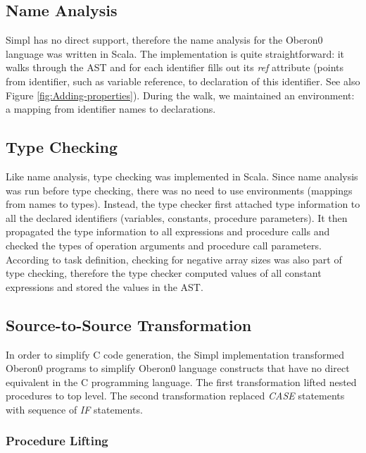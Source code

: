 \subsection{Name Analysis}

Simpl has no direct support, therefore the name analysis for the Oberon0
language was written in Scala. The implementation is quite straightforward:
it walks through the AST and for each identifier fills out its \emph{ref}
attribute (points from identifier, such as variable reference, to
declaration of this identifier. See also Figure \ref{fig:Adding-properties}).
During the walk, we maintained an environment: a mapping from identifier
names to declarations.






\subsection{Type Checking}

Like name analysis, type checking was implemented in Scala. Since
name analysis was run before type checking, there was no need to use
environments (mappings from names to types). Instead, the type checker
first attached type information to all the declared identifiers (variables,
constants, procedure parameters). It then propagated the type information
to all expressions and procedure calls and checked the types of operation
arguments and procedure call parameters.  According to task definition,
checking for negative array sizes was also part of type checking,
therefore the type checker computed values of all constant expressions
and stored the values in the AST.




\subsection{Source-to-Source Transformation}

In order to simplify C code generation, the Simpl implementation transformed
Oberon0 programs to simplify Oberon0 language constructs that have
no direct equivalent in the C programming language. The first transformation
lifted nested procedures to top level. The second transformation replaced
\emph{CASE} statements with sequence of \emph{IF} statements.


\subsubsection{\label{sub:Procedure-Lifting}Procedure Lifting}

